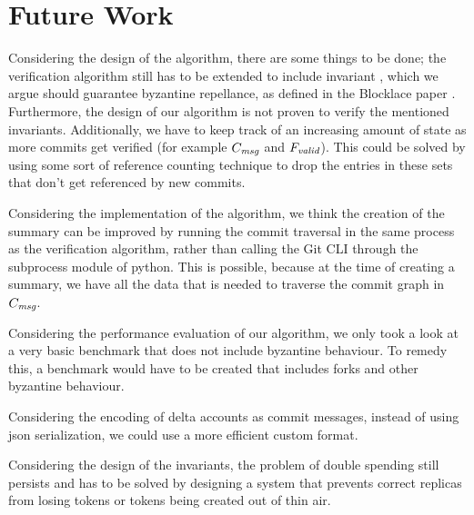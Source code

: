 \section {Future Work}
Considering the design of the algorithm, there are some things to be done; the verification algorithm still has to be extended to include invariant , which we argue should guarantee byzantine repellance, as defined in the Blocklace paper \cite{blocklace-crdt}. Furthermore, the design of our algorithm is not proven to verify the mentioned invariants.
Additionally, we have to keep track of an increasing amount of state as more commits get verified (for example $C_\emph{msg}$ and $F_\emph{valid}$). This could be solved by using some sort of reference counting technique to drop the entries in these sets that don't get referenced by new commits.

Considering the implementation of the algorithm, we think the creation of the summary can be improved by running the commit traversal in the same process as the verification algorithm, rather than calling the Git CLI through the subprocess module of python. This is possible, because at the time of creating a summary, we have all the data that is needed to traverse the commit graph in $C_\emph{msg}$.

Considering the performance evaluation of our algorithm, we only took a look at a very basic benchmark that does not include byzantine behaviour. To remedy this, a benchmark would have to be created that includes forks and other byzantine behaviour.

Considering the encoding of delta accounts as commit messages, instead of using json serialization, we could use a more efficient custom format.

Considering the design of the invariants, the problem of double spending still persists and has to be solved by designing a system that prevents correct replicas from losing tokens or tokens being created out of thin air.
